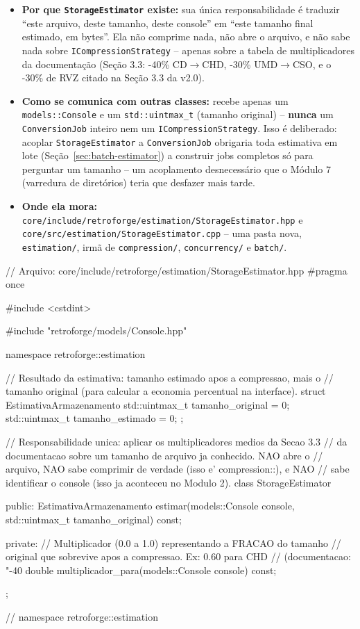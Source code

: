 \begin{itemize}
    \item \textbf{Por que \texttt{StorageEstimator} existe:} sua única responsabilidade é traduzir ``este arquivo, deste tamanho, deste console'' em ``este tamanho final estimado, em bytes''. Ela não comprime nada, não abre o arquivo, e não sabe nada sobre \texttt{ICompressionStrategy} -- apenas sobre a tabela de multiplicadores da documentação (Seção 3.3: -40\% CD$\to$CHD, -30\% UMD$\to$CSO, e o -30\% de RVZ citado na Seção 3.3 da v2.0).
    \item \textbf{Como se comunica com outras classes:} recebe apenas um \texttt{models::Console} e um \texttt{std::uintmax\_t} (tamanho original) -- \textbf{nunca} um \texttt{ConversionJob} inteiro nem um \texttt{ICompressionStrategy}. Isso é deliberado: acoplar \texttt{StorageEstimator} a \texttt{ConversionJob} obrigaria toda estimativa em lote (Seção~\ref{sec:batch-estimator}) a construir jobs completos só para perguntar um tamanho -- um acoplamento desnecessário que o Módulo 7 (varredura de diretórios) teria que desfazer mais tarde.
    \item \textbf{Onde ela mora:} \texttt{core/include/retroforge/estimation/StorageEstimator.hpp} e \texttt{core/src/estimation/StorageEstimator.cpp} -- uma pasta nova, \texttt{estimation/}, irmã de \texttt{compression/}, \texttt{concurrency/} e \texttt{batch/}.
\end{itemize}

\begin{CaixaCodigo}
// Arquivo: core/include/retroforge/estimation/StorageEstimator.hpp
#pragma once

#include <cstdint>

#include "retroforge/models/Console.hpp"

namespace retroforge::estimation {

// Resultado da estimativa: tamanho estimado apos a compressao, mais o
// tamanho original (para calcular a economia percentual na interface).
struct EstimativaArmazenamento {
    std::uintmax_t tamanho_original = 0;
    std::uintmax_t tamanho_estimado = 0;
};

// Responsabilidade unica: aplicar os multiplicadores medios da Secao 3.3
// da documentacao sobre um tamanho de arquivo ja conhecido. NAO abre o
// arquivo, NAO sabe comprimir de verdade (isso e' compression::), e NAO
// sabe identificar o console (isso ja aconteceu no Modulo 2).
class StorageEstimator {
public:
    EstimativaArmazenamento estimar(models::Console console,
                                     std::uintmax_t tamanho_original) const;

private:
    // Multiplicador (0.0 a 1.0) representando a FRACAO do tamanho
    // original que sobrevive apos a compressao. Ex: 0.60 para CHD
    // (documentacao: "-40%
    double multiplicador_para(models::Console console) const;
};

} // namespace retroforge::estimation
\end{CaixaCodigo}

